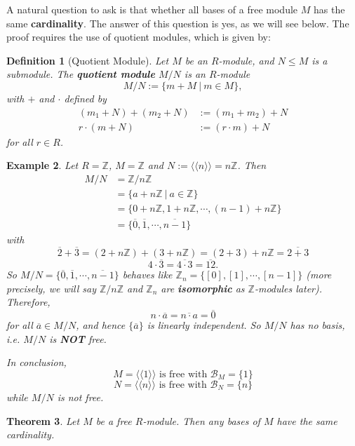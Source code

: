 \documentclass[12pt]{amsbook}
\newtheorem{theorem}{Theorem}[section]
\newtheorem{definition}[theorem]{Definition}
\newtheorem{example}[theorem]{Example}
\begin{document}
A natural question to ask is that whether all bases of a free module $M$ has the same {\bf cardinality}. The answer of this question is yes, as we will see below. The proof requires the use of quotient modules, which is given by:
\begin{definition}[Quotient Module]
    Let $M$ be an $R$-module, and $N\leq M$ is a submodule. The {\bf quotient module} $M/N$ is an $R$-module
    $$M/N:=\{m+M \ |\ m\in M\},$$
    with $+$ and $\cdot$ defined by
    \begin{align*}
        (m_1+N)+(m_2+N)&:=(m_1+m_2)+N\\
        r\cdot (m+N)&:=(r\cdot m)+N
    \end{align*}
    for all $r\in R$.
\end{definition}

\begin{example}
    Let $R=\mathbb{Z}$, $M=\mathbb{Z}$ and $N:=\langle\langle n\rangle\rangle=n\mathbb{Z}$. Then
    \begin{align*}
        M/N&=\mathbb{Z}/n\mathbb{Z}\\
        &=\{a+n\mathbb{Z}\ |\ a\in \mathbb{Z}\}\\
        &=\{0+n\mathbb{Z},1+n\mathbb{Z},\cdots,(n-1)+n\mathbb{Z}\}\\
        &=\{\overline{0},\overline{1},\cdots,\overline{n-1}\}
    \end{align*}
    with
    $$\overline{2}+\overline{3}=(2+n\mathbb{Z})+(3+n\mathbb{Z})=(2+3)+n\mathbb{Z}=\overline{2+3}$$
    $$4\cdot \overline{3}=\overline{4\cdot3}=\overline{12}.$$
    So $M/N=\{\overline{0},\overline{1},\cdots,\overline{n-1}\}$ behaves like $\mathbb{Z}_{n}=\{[0],[1],\cdots,[n-1]\}$ (more precisely, we will say $\mathbb{Z}/n\mathbb{Z}$ and $\mathbb{Z}_n$ are {\bf isomorphic} as $\mathbb{Z}$-modules later). Therefore,
    $$n\cdot\overline{a}=\overline{n\cdot a}=\overline{0}$$
    for all $\overline{a}\in M/N$, and hence $\{\overline{a}\}$ is linearly independent. So $M/N$ has no basis, i.e. $M/N$ is {\bf NOT} free.

    In conclusion,
    $$M=\langle\langle1\rangle\rangle\text{ is free with }\mathcal{B}_{M}=\{1\}$$
    $$N=\langle\langle n\rangle\rangle\text{ is free with }\mathcal{B}_{N}=\{n\}$$
    while $M/N$ is not free.
\end{example}

\begin{theorem} \label{thm-freebasis}
    Let $M$ be a free $R$-module. Then any bases of $M$ have the same cardinality.
\end{theorem}
\end{document}
